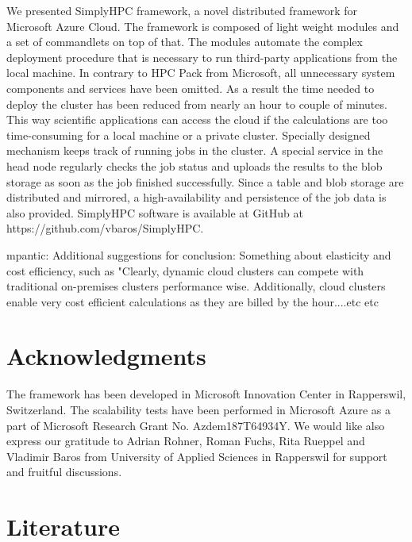 \documentclass[3p,times]{elsarticle}
\begin{document}
We presented SimplyHPC framework, a novel distributed framework for Microsoft Azure Cloud. The framework is composed of light weight modules and a set of commandlets on top of that. The modules automate the complex deployment procedure that is necessary to run third-party applications from the local machine. In contrary to HPC Pack from Microsoft, all unnecessary system components and services have been omitted. As a result the time needed to deploy the cluster has been reduced from nearly an hour to couple of minutes.  This way scientific applications can access the cloud if the calculations are too time-consuming for a local machine or a private cluster. Specially designed mechanism keeps track of running jobs in the cluster. A special service in the head node regularly checks the job status and uploads the results to the blob storage as soon as the job finished successfully. Since a table and blob storage are distributed and mirrored, a high-availability and persistence of the job data is also provided. SimplyHPC software is available at GitHub at https://github.com/vbaros/SimplyHPC.

\textcolor[rgb]{1,0,0}{mpantic: Additional suggestions for conclusion: Something about elasticity and cost efficiency, such as "Clearly, dynamic cloud clusters can compete with traditional on-premises clusters performance wise. Additionally, cloud clusters enable very cost efficient calculations as they are billed by the hour....etc etc}



\section{Acknowledgments}
\label{sec:ackn}

The framework has been developed in Microsoft Innovation Center in Rapperswil, Switzerland. The scalability tests have been performed in Microsoft Azure as a part of Microsoft Research Grant No. Azdem187T64934Y. We would like also express our gratitude to Adrian Rohner, Roman Fuchs, Rita Rueppel and Vladimir Baros from University of Applied Sciences in Rapperswil for support and fruitful discussions.

\section{Literature}
\label{sec:literature}



\end{document}
